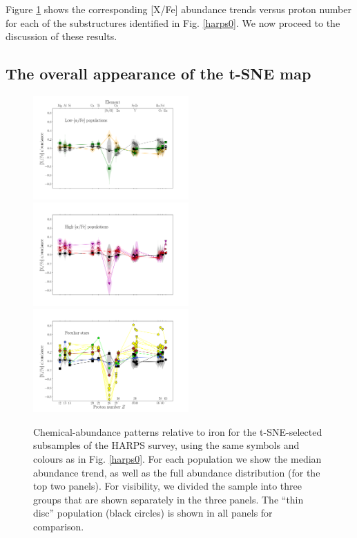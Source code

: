 \documentclass{aa}  %
\begin{document}
Figure \ref{harps3} shows the corresponding [X/Fe] abundance trends versus proton number for each of the substructures identified in Fig. \ref{harps0}. We now proceed to the discussion of these results.

\subsection{The overall appearance of the t-SNE map}

\begin{figure}%
\sidecaption
 \includegraphics[trim=0cm 2cm 0cm 0cm, clip=true, width=0.53\textwidth]{im/harps_tsne_abundances-relto-Fe_thin.png}\\
 \includegraphics[trim=0cm 2cm 0cm 2cm, clip=true, width=0.53\textwidth]{im/harps_tsne_abundances-relto-Fe_thick.png}\\
 \includegraphics[trim=0cm 0 0cm 2cm, clip=true, width=0.53\textwidth]{im/harps_tsne_abundances-relto-Fe_strange.png}
\caption{Chemical-abundance patterns relative to iron for the t-SNE-selected subsamples of the HARPS survey, using the same symbols and colours as in Fig. \ref{harps0}. For each population we show the median abundance trend, as well as the full abundance distribution (for the top two panels). For visibility, we divided the sample into three groups that are shown separately in the three panels. The ``thin disc'' population (black circles) is shown in all panels for comparison.}
\label{harps3}
\end{figure}
\end{document}
